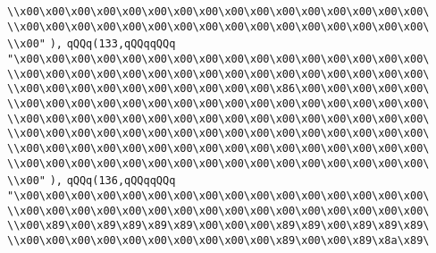 \verb|\\x00\x00\x00\x00\x00\x00\x00\x00\x00\x00\x00\x00\x00\x00\x00\x00\|\newline
\verb|\\x00\x00\x00\x00\x00\x00\x00\x00\x00\x00\x00\x00\x00\x00\x00\x00\|\newline
\verb|\\x00"|\newline
\verb|),|\newline
\verb|qQQq(133,qQQqqQQq|\newline
\verb|"\x00\x00\x00\x00\x00\x00\x00\x00\x00\x00\x00\x00\x00\x00\x00\x00\|\newline
\verb|\\x00\x00\x00\x00\x00\x00\x00\x00\x00\x00\x00\x00\x00\x00\x00\x00\|\newline
\verb|\\x00\x00\x00\x00\x00\x00\x00\x00\x00\x00\x86\x00\x00\x00\x00\x00\|\newline
\verb|\\x00\x00\x00\x00\x00\x00\x00\x00\x00\x00\x00\x00\x00\x00\x00\x00\|\newline
\verb|\\x00\x00\x00\x00\x00\x00\x00\x00\x00\x00\x00\x00\x00\x00\x00\x00\|\newline
\verb|\\x00\x00\x00\x00\x00\x00\x00\x00\x00\x00\x00\x00\x00\x00\x00\x00\|\newline
\verb|\\x00\x00\x00\x00\x00\x00\x00\x00\x00\x00\x00\x00\x00\x00\x00\x00\|\newline
\verb|\\x00\x00\x00\x00\x00\x00\x00\x00\x00\x00\x00\x00\x00\x00\x00\x00\|\newline
\verb|\\x00"|\newline
\verb|),|\newline
\verb|qQQq(136,qQQqqQQq|\newline
\verb|"\x00\x00\x00\x00\x00\x00\x00\x00\x00\x00\x00\x00\x00\x00\x00\x00\|\newline
\verb|\\x00\x00\x00\x00\x00\x00\x00\x00\x00\x00\x00\x00\x00\x00\x00\x00\|\newline
\verb|\\x00\x89\x00\x89\x89\x89\x89\x00\x00\x00\x89\x89\x00\x89\x89\x89\|\newline
\verb|\\x00\x00\x00\x00\x00\x00\x00\x00\x00\x00\x89\x00\x00\x89\x8a\x89\|\newline
